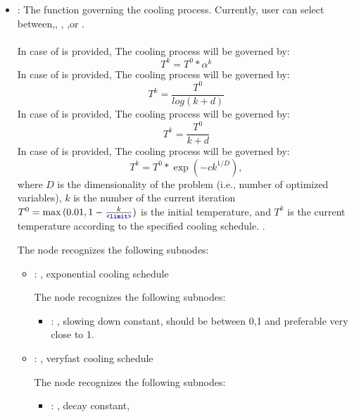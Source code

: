 \begin{itemize}
    \item {}:
      The function governing the cooling process. Currently, user can select
      between,,                  ,
      ,or .\\ \\In case of  is
      provided, The cooling process will be governed by: $$ T^{k} = T^0 * \alpha^k$$
      In case of  is provided, The cooling process will be governed by: $$
      T^{k} = \frac{T^0}{log(k + d)}$$                  In case of  is provided,
      The cooling process will be governed by: $$ T^{k} = \frac{T^0}{k + d}$$In case of
       is provided, The cooling process will be governed by: $$ T^{k} =  T^0 *
      \exp(-ck^{1/D}),$$                  where $D$ is the dimensionality of the problem (i.e.,
      number of optimized variables), $k$ is the number of the current iteration
      $T^{0} = \max{(0.01,1-\frac{k}{\xmlNode{limit}})}$ is the initial temperature, and $T^{k}$ is
      the current temperature                  according to the specified cooling schedule.
      .

      The  node recognizes the following subnodes:
      \begin{itemize}
        \item {}: ,
          exponential cooling schedule

          The  node recognizes the following subnodes:
          \begin{itemize}
            \item {}: ,
              slowing down constant, should be between 0,1 and preferable very close to 1.
          \end{itemize}

        \item {}: ,
          veryfast cooling schedule

          The  node recognizes the following subnodes:
          \begin{itemize}
            \item {}: ,
              decay constant, 
          \end{itemize}


\end{itemize}
\end{itemize}
